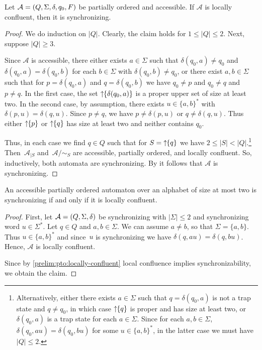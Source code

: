 \begin{proposition}\label{prelim:pto:locally-confluent}
	Let $\mathcal A = (Q, \Sigma, \delta, q_0, F)$ be partially ordered and accessible.
	If $\mathcal A$ is locally confluent, then it is synchronizing.
\end{proposition}
\begin{proof}
	We do induction on $|Q|$.
	Clearly, the claim holds for $1 \le |Q| \le 2$.
	Next, suppose $|Q| \ge 3$.	
	
	Since $\mathcal A$ is accessible,
	there either exists $a \in \Sigma$
	such that $\delta(q_0, a) \ne q_0$
	and $\delta(q_0, a) = \delta(q_0, b)$
	for each $b \in \Sigma$ with $\delta(q_0, b) \ne q_0$,
	or there exist $a,b \in \Sigma$	such that for $p = \delta(q_0, a)$
	and $q = \delta(q_0, b)$ we have $q_0 \ne p$ and $q_0 \ne q$
	and $p \ne q$. In the first case,
	the set $\mbox{\ensuremath{\displaystyle \uparrow \!\!\{\delta(q_0, a)\}}}$
	is a proper upper set of size at least two.
	In the second case,	by assumption, 
	there exists $u \in \{a,b\}^*$
	with $\delta(p, u) = \delta(q, u)$.
	Since $p \ne q$, we have $p \ne \delta(p, u)$ or $q \ne \delta(q, u)$. 
	Thus either $\mbox{\ensuremath{\displaystyle \uparrow \!\!\{p\}}}$ or $\mbox{\ensuremath{\displaystyle \uparrow \!\!\{q\}}}$ has size at least two and neither contains $q_0$.
	
	Thus, in each case we find $q \in Q$ such that  for $S = \mbox{\ensuremath{\displaystyle \uparrow \!\!\{q\}}}$
	we have $2 \le |S| < |Q|$.\footnote{Alternatively,
		either there exists $a \in \Sigma$
		such that $q = \delta(q_0, a)$ is not a trap state
		and $q \ne q_0$, in which case $\mbox{\ensuremath{\displaystyle \uparrow \!\!\{q\}}}$
		is proper and has size at least two,
		or $\delta(q_0, a)$ is a trap state for each $a \in \Sigma$.
		Since for each $a,b \in \Sigma$, $\delta(q_0, au) = \delta(q_0, bu)$
		for some $u \in \{a,b\}^*$,
		in the latter case we must have $|Q| \le 2$.}    	
	Then~$\mathcal A_{|S}$ and~$\mathcal A / {\sim_S}$
	are accessible, partially ordered, and locally confluent.
	So, inductively, both automata are synchronizing.
	By 
	it follows that $\mathcal A$ is synchronizing.
\end{proof}

\begin{corollary}\label{prelim:cor:pto:locally-confluent}
	An accessible partially ordered automaton over an alphabet of size at most two
	is synchronizing if and only if it is locally confluent.
\end{corollary} 
\begin{proof}
	First, let $\mathcal A = (Q, \Sigma, \delta)$
	be synchronizing with $|\Sigma| \le 2$
	and synchronizing word $u \in \Sigma^*$.
	Let $q \in Q$ and $a,b \in \Sigma$.
	We can assume $a \ne b$,
	so that $\Sigma = \{a,b\}$.
	Thus $u \in \{a,b\}^*$
	and since~$u$ is synchronizing we have $\delta(q, au) = \delta(q, bu)$.
	Hence, $\mathcal A$ is locally confluent.
	
	Since by \cref{prelim:pto:locally-confluent} 
	local confluence implies synchronizability,
	we obtain the claim.
\end{proof}

